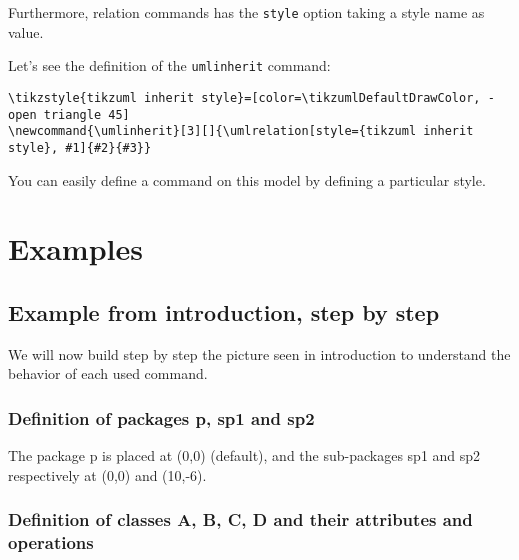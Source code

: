 \documentclass[a4paper,11pt]{report}
\begin{document}
Furthermore, relation commands has the {\tt style} option taking a \TikZ style name as value.

Let's see the definition of the {\tt umlinherit} command:

\begin{lstlisting}
\tikzstyle{tikzuml inherit style}=[color=\tikzumlDefaultDrawColor, -open triangle 45]
\newcommand{\umlinherit}[3][]{\umlrelation[style={tikzuml inherit style}, #1]{#2}{#3}}
\end{lstlisting}

You can easily define a command on this model by defining a particular style.

\section{Examples}

\subsection{Example from introduction, step by step}

We will now build step by step the picture seen in introduction to understand the behavior of each used command.

\subsubsection{Definition of packages p, sp1 and sp2}

The package p is placed at (0,0) (default), and the sub-packages sp1 and sp2 respectively at (0,0) and (10,-6).

{\color{red!70!black}
\vspace{-0.4cm}
\vspace{-0.4cm}
\vspace{-0.4cm}

}

\begin{center}
\end{center}

\subsubsection{Definition of classes A, B, C, D and their attributes and operations}
\end{document}
